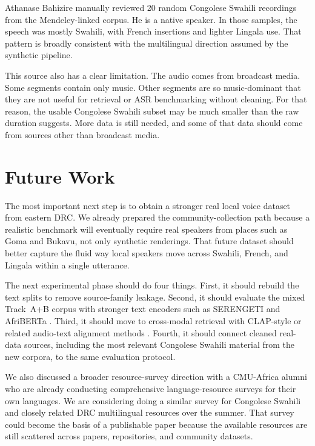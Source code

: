 \documentclass[11pt,twocolumn]{article}
\begin{document}
Athanase Bahizire manually reviewed 20 random Congolese Swahili recordings from the Mendeley-linked corpus. He is a native speaker. In those samples, the speech was mostly Swahili, with French insertions and lighter Lingala use. That pattern is broadly consistent with the multilingual direction assumed by the synthetic pipeline.

This source also has a clear limitation. The audio comes from broadcast media. Some segments contain only music. Other segments are so music-dominant that they are not useful for retrieval or ASR benchmarking without cleaning. For that reason, the usable Congolese Swahili subset may be much smaller than the raw duration suggests. More data is still needed, and some of that data should come from sources other than broadcast media.

\section{Future Work}
The most important next step is to obtain a stronger real local voice dataset from eastern DRC. We already prepared the community-collection path because a realistic benchmark will eventually require real speakers from places such as Goma and Bukavu, not only synthetic renderings. That future dataset should better capture the fluid way local speakers move across Swahili, French, and Lingala within a single utterance.

The next experimental phase should do four things. First, it should rebuild the text splits to remove source-family leakage. Second, it should evaluate the mixed Track~A+B corpus with stronger text encoders such as SERENGETI and AfriBERTa \cite{serengeti,afriberta}. Third, it should move to cross-modal retrieval with CLAP-style or related audio-text alignment methods \cite{elizalde2019crossmodal,nuga2025multilingual}. Fourth, it should connect cleaned real-data sources, including the most relevant Congolese Swahili material from the new corpora, to the same evaluation protocol.

We also discussed a broader resource-survey direction with a CMU-Africa alumni who are already conducting comprehensive language-resource surveys for their own languages. We are considering doing a similar survey for Congolese Swahili and closely related DRC multilingual resources over the summer. That survey could become the basis of a publishable paper because the available resources are still scattered across papers, repositories, and community datasets.
\end{document}
